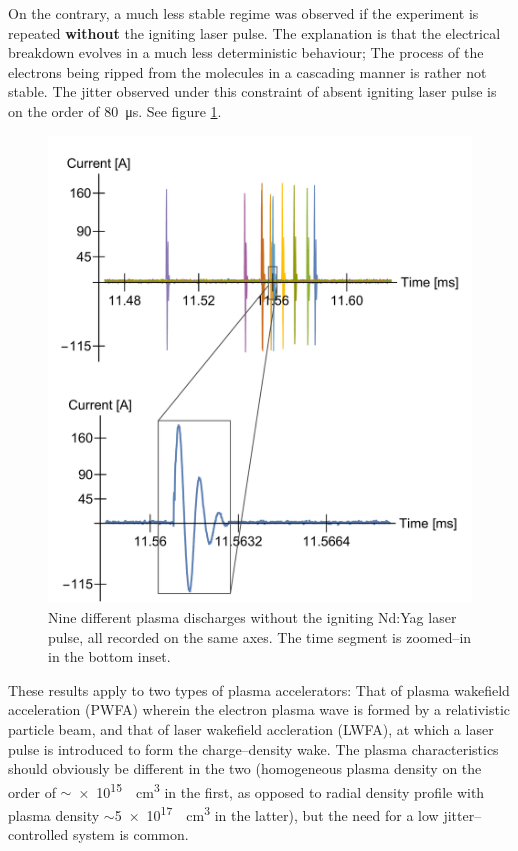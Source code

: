 \documentclass[../main.tex]{subfiles}
\begin{document}
On the contrary, a much less stable regime was observed if the experiment is repeated \textbf{without} the igniting laser pulse. The explanation is that the electrical breakdown evolves in a much less deterministic behaviour; The process of the electrons being ripped from the molecules in a cascading manner is rather not stable. The jitter observed under this constraint of absent igniting laser pulse is on the order of \SI{80}{\us}. See figure \ref{fig:multiple}.
\begin{figure}
    \centering
    \includegraphics[width=\textwidth]{figures/jitter/multiple.pdf}
    \caption{Nine different plasma discharges without the igniting Nd:Yag laser pulse, all recorded on the same axes. The time segment is zoomed--in in the bottom inset.}
    \label{fig:multiple}
\end{figure}

These results apply to two types of plasma accelerators: That of plasma wakefield acceleration (PWFA)\cite{BiagioniGasPulse} wherein the electron plasma wave is formed by a relativistic particle beam, and that of laser wakefield accleration (LWFA)\cite{RazLowCapillary}, at which a laser pulse is introduced to form the charge--density wake. The plasma characteristics should obviously be different in the two (homogeneous plasma density on the order of $\sim$\SI{e15}{\per\cubic\cm} in the first, as opposed to radial density profile with plasma density $\sim$\SI{5e17}{\per\cubic\cm} in the latter), but the need for a low jitter--controlled system is common.
\end{document}
